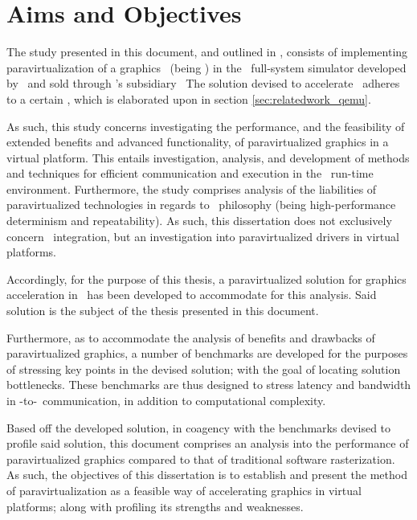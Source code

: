 
\chapter{Aims and Objectives}
\label{cha:aimsandobjectives}
The study presented in this document, and outlined in , consists of implementing paravirtualization of a graphics \dvttermapi\ (being \dvttermopenglestwopointo ) in the \dvttermsimics\ full-system simulator developed by \dvttermintel\ and sold through \dvttermintel 's subsidiary \dvttermwindriver\ 
The solution devised to accelerate \dvttermopengl\ adheres to a certain \dvttermreferencesolution , which is elaborated upon in section \ref{sec:relatedwork_qemu}.

As such, this study concerns investigating the performance, and the feasibility of extended benefits and advanced functionality, of paravirtualized graphics in a virtual platform.
This entails investigation, analysis, and development of methods and techniques for efficient communication and execution in the \dvttermsimics\ run-time environment.
Furthermore, the study comprises analysis of the liabilities of paravirtualized technologies in regards to \dvttermsimics\ philosophy (being high-performance determinism and repeatability).
As such, this dissertation does not exclusively concern \dvttermsimics\ integration, but an investigation into paravirtualized drivers in virtual platforms.

Accordingly, for the purpose of this thesis, a paravirtualized solution for graphics acceleration in \dvttermsimics\ has been developed to accommodate for this analysis.
Said solution is the subject of the thesis presented in this document.

Furthermore, as to accommodate the analysis of benefits and drawbacks of paravirtualized graphics, a number of benchmarks are developed for the purposes of stressing key points in the devised solution; with the goal of locating solution bottlenecks.
These benchmarks are thus designed to stress latency and bandwidth in \dvttermtarget -to-\dvttermhost\ communication, in addition to computational complexity.

Based off the developed solution, in coagency with the benchmarks devised to profile said solution, this document comprises an analysis into the performance of paravirtualized graphics compared to that of traditional software rasterization.
As such, the objectives of this dissertation is to establish and present the method of paravirtualization as a feasible way of accelerating graphics in virtual platforms; along with profiling its strengths and weaknesses.\\

